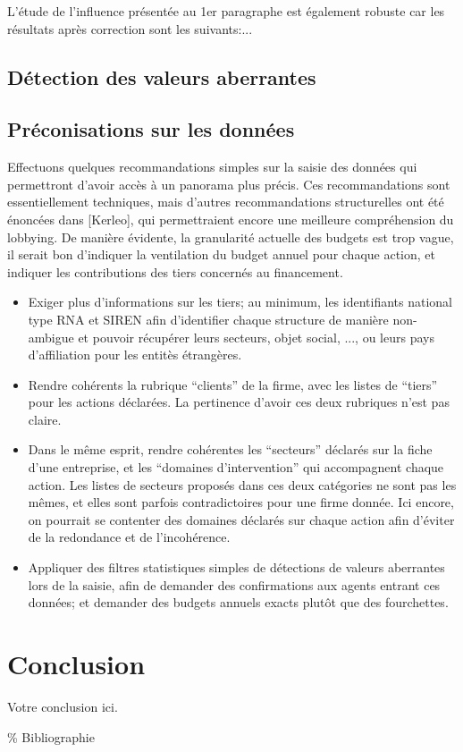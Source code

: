 \documentclass[a4paper,12pt]{article}
\begin{document}
L’étude de l’influence présentée au 1er paragraphe est également robuste car les résultats après correction sont les suivants:...


\subsection{Détection des valeurs aberrantes}

\subsection{Préconisations sur les données}

Effectuons quelques recommandations simples sur la saisie des données qui permettront d'avoir accès à un panorama plus précis. 
Ces recommandations sont essentiellement techniques, mais d'autres recommandations structurelles ont été énoncées dans [Kerleo], qui permettraient encore une meilleure compréhension du lobbying. De manière évidente,  la granularité actuelle des budgets est trop vague, il serait bon d'indiquer la ventilation du budget annuel pour chaque action, et indiquer les contributions des tiers concernés au financement.
\begin{itemize}
\item Exiger plus d'informations sur les tiers; au minimum, les identifiants national type RNA et SIREN afin d'identifier chaque structure de manière non-ambigue et pouvoir récupérer leurs secteurs, objet social, ..., ou leurs pays d'affiliation pour les entitès étrangères.
\item Rendre cohérents la rubrique ``clients'' de la firme, avec les listes de ``tiers'' pour les actions déclarées. La pertinence d'avoir ces deux rubriques n'est pas claire.
\item Dans le m\^eme esprit, rendre cohérentes les ``secteurs'' déclarés sur la fiche d'une entreprise, et les ``domaines d'intervention'' qui accompagnent chaque action. Les listes de secteurs proposés dans ces deux catégories ne sont pas les m\^emes, et elles sont parfois contradictoires pour une firme donnée. Ici encore, on pourrait se contenter des domaines déclarés sur chaque action afin d'éviter de la redondance et de l'incohérence.
\item Appliquer des filtres statistiques simples de détections de valeurs aberrantes lors de la saisie, afin de demander des confirmations aux agents entrant ces données; et demander des budgets annuels exacts plut\^ot que des fourchettes.
\end{itemize}

  
 
   
\section{Conclusion}
Votre conclusion ici.

\% Bibliographie


\end{document}
